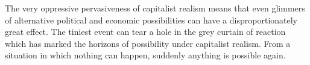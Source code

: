 The very oppressive pervasiveness of capitalist realism means that even glimmers of alternative political and economic possibilities can have a disproportionately great effect. The tiniest event can tear a hole in the grey curtain of reaction which has marked the horizons of possibility under capitalist realism. From a situation in which nothing can happen, suddenly anything is possible again.


